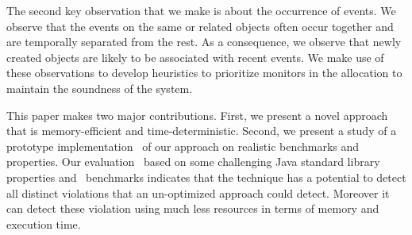 The second key observation that we make is about the occurrence of events.
We observe that the events on the same or related objects often occur together
and are temporally separated from the rest. As a consequence, we observe
that newly created objects are likely to be associated with recent events.
We make use of these observations to develop heuristics to prioritize monitors
in the allocation to maintain the soundness of the system.


This paper makes two major contributions.
First, we present a novel approach~ that is memory-efficient 
and time-deterministic. Second, we present a study of a prototype 
implementation~ of our approach on realistic 
benchmarks and properties. Our evaluation~ based on some
challenging Java standard library properties and \dacapo\ benchmarks 
indicates that the technique has a potential to detect all distinct violations that an 
un-optimized approach could detect. Moreover it can detect these violation using
much less resources in terms of memory and execution time.



